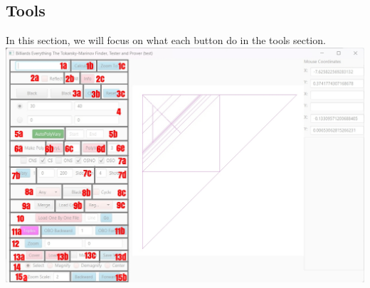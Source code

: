 \documentclass[11pt]{report}
\begin{document}
\subsection{Tools}
In this section, we will focus on what each button do in the tools section. \\ 
\linebreak
\includegraphics[scale=0.38]{main_interface_labeled}
\end{document}
